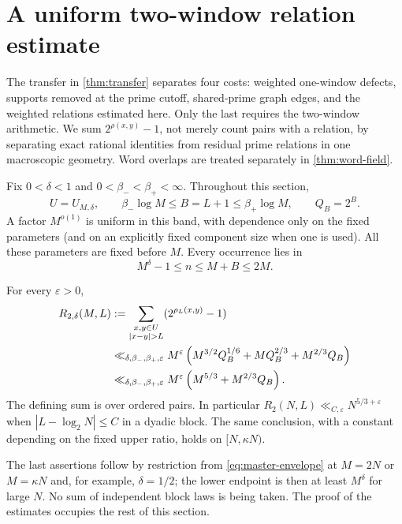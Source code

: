\section{A uniform two-window relation estimate}\label{sec:two-window-anatomy}
The transfer in \cref{thm:transfer} separates four costs: weighted
one-window defects, supports removed at the prime cutoff, shared-prime
graph edges, and the weighted relations estimated here. Only the last
requires the two-window arithmetic. We sum $2^{\rho(x,y)}-1$, not merely
count pairs with a relation, by separating exact rational identities from
residual prime relations in one macroscopic geometry. Word overlaps are
treated separately in \cref{thm:word-field}.

Fix $0<\delta<1$ and $0<\beta_-<\beta_+<\infty$. Throughout this section,
\begin{equation}\label{eq:uniform-band}
 U=U_{M,\delta},\qquad \beta_-\log M\le B=L+1\le\beta_+\log M,
 \qquad Q_B=2^B.
\end{equation}
A factor $M^{o(1)}$ is uniform in this band, with dependence only on the
fixed parameters (and on an explicitly fixed component size when one is
used). All these parameters are fixed before $M$. Every occurrence lies in
\begin{equation}\label{macro:eq:occ-range}
 M^\delta-1\le n\le M+B\le2M.
\end{equation}

\begin{theorem}\label{thm:master-profile}
For every $\varepsilon>0$,
\begin{align}
 R_{2,\delta}(M,L)
 &:=\sum_{\substack{x,y\in U\\|x-y|>L}}(2^{\rho_L(x,y)}-1)\notag\\
 &\ll_{\delta,\beta_-,\beta_+,\varepsilon}
 M^\varepsilon\left(M^{3/2}Q_B^{1/6}+MQ_B^{2/3}+M^{2/3}Q_B\right)
 \label{eq:master-profile}\\
 &\ll_{\delta,\beta_-,\beta_+,\varepsilon}
 M^\varepsilon\left(M^{5/3}+M^{2/3}Q_B\right).
 \label{eq:master-envelope}
\end{align}
The defining sum is over ordered pairs. In particular
$R_2(N,L)\ll_{C,\varepsilon}N^{5/3+\varepsilon}$ when
$|L-\log_2N|\le C$ in a dyadic block. The same conclusion, with a constant
depending on the fixed upper ratio, holds on $[N,\kappa N)$.
\end{theorem}
The last assertions follow by restriction from \eqref{eq:master-envelope}
at $M=2N$ or $M=\kappa N$ and, for example, $\delta=1/2$; the lower endpoint
is then at least $M^\delta$ for large $N$. No sum of independent block laws
is being taken. The proof of the estimates occupies the rest of this section.


